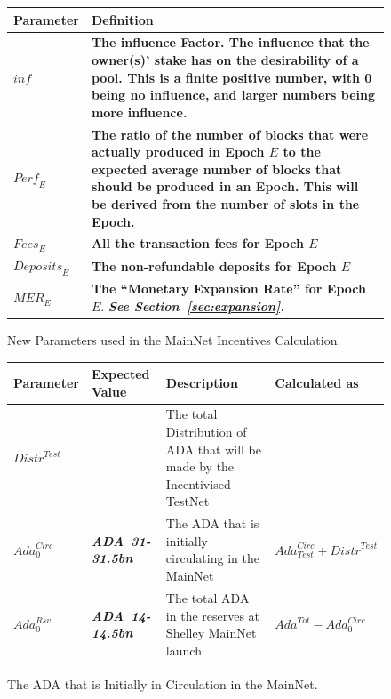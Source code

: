 \documentclass[11pt,a4paper,dvipsnames,twosided,final]{article}
\newcommand{\ada}{ADA{}}
\newcommand{\ADA}[1]{\textbf{\emph{\ada~{#1}}}}
\begin{document}
\begin{figure}[h!]
\begin{center}
\begin{tabular}{||l|p{13cm}||}
  \hline \hline
  \textbf{Parameter} & \textbf{Definition} \\\hline
\textbf{\color{green}  $\textit{inf}$} & \textbf{\color{green} The influence Factor. The influence that the owner(s)' stake has on the
  desirability of a pool. This is a finite positive number, with 0 being no influence, and larger numbers being more influence. } \\\hline
\textbf{\color{cyan}  $\textit{Perf}_E$} & \textbf{\color{cyan} The ratio of the number of blocks that were actually produced in Epoch $E$ to the expected average number of blocks that should be produced in an Epoch.
  This will be derived from the number of slots in the Epoch.} \\\hline
\textbf{\color{cyan}$\textit{Fees}_E$} & \textbf{\color{cyan}All the transaction fees for Epoch $E$} \\\hline
\textbf{\color{cyan}$\textit{Deposits}_E$} & \textbf{\color{cyan} The non-refundable deposits for Epoch $E$} \\\hline
\textbf{\color{cyan} $\textit{MER}_E$} & \textbf{\color{cyan} The ``Monetary Expansion Rate'' for Epoch $E$}. \newline \textbf{\color{cyan} \emph{See Section~\ref{sec:expansion}.}} \\\hline
\hline
\end{tabular}
\end{center}
\caption{New Parameters used in the MainNet Incentives Calculation.}
\end{figure}

\clearpage
\begin{figure}[h!]
\begin{center}
\begin{tabular}{||l|l|p{6cm}|l||}
  \hline \hline
\textbf{Parameter} & \textbf{Expected Value} & \textbf{Description} & \textbf{Calculated as} \\\hline
${\textit{Distr}}^{Test}$ & & The total Distribution of \ada{} that will be made by the Incentivised TestNet & \\\hline
$\textit{Ada}^{\textit{Circ}}_{0}$ & \ADA{31-31.5bn} & The \ada{} that is initially circulating in the MainNet & $\textit{Ada}^{\textit{Circ}}_{\textit{Test}} + {\textit{Distr}}^{\textit{Test}}$ \\\hline
$\textit{Ada}^{\textit{Rsv}}_{0}$ & \ADA{14-14.5bn} & The total \ada{} in the reserves at Shelley MainNet launch & $\textit{Ada}^{Tot} - \textit{Ada}^{\textit{Circ}}_{0}$ \\\hline
\hline
\end{tabular}
\end{center}
\caption{The \ada{} that is Initially in Circulation in the MainNet.}
\end{figure}
\end{document}

